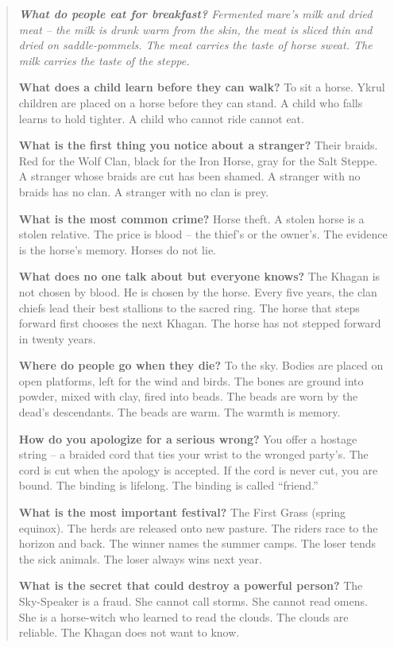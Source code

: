 \documentclass[12pt,oneside]{book}
\newenvironment{almanac}
  {\begin{quote}\small\itshape}
  {\end{quote}}
\begin{document}
\vspace{1em}
\begin{almanac}
\textbf{What do people eat for breakfast?} Fermented mare's milk and dried meat -- the milk is drunk warm from the skin, the meat is sliced thin and dried on saddle-pommels. The meat carries the taste of horse sweat. The milk carries the taste of the steppe.

\textbf{What does a child learn before they can walk?} To sit a horse. Ykrul children are placed on a horse before they can stand. A child who falls learns to hold tighter. A child who cannot ride cannot eat.

\textbf{What is the first thing you notice about a stranger?} Their braids. Red for the Wolf Clan, black for the Iron Horse, gray for the Salt Steppe. A stranger whose braids are cut has been shamed. A stranger with no braids has no clan. A stranger with no clan is prey.

\textbf{What is the most common crime?} Horse theft. A stolen horse is a stolen relative. The price is blood -- the thief's or the owner's. The evidence is the horse's memory. Horses do not lie.

\textbf{What does no one talk about but everyone knows?} The Khagan is not chosen by blood. He is chosen by the horse. Every five years, the clan chiefs lead their best stallions to the sacred ring. The horse that steps forward first chooses the next Khagan. The horse has not stepped forward in twenty years.

\textbf{Where do people go when they die?} To the sky. Bodies are placed on open platforms, left for the wind and birds. The bones are ground into powder, mixed with clay, fired into beads. The beads are worn by the dead's descendants. The beads are warm. The warmth is memory.

\textbf{How do you apologize for a serious wrong?} You offer a hostage string -- a braided cord that ties your wrist to the wronged party's. The cord is cut when the apology is accepted. If the cord is never cut, you are bound. The binding is lifelong. The binding is called ``friend.''

\textbf{What is the most important festival?} The First Grass (spring equinox). The herds are released onto new pasture. The riders race to the horizon and back. The winner names the summer camps. The loser tends the sick animals. The loser always wins next year.

\textbf{What is the secret that could destroy a powerful person?} The Sky-Speaker is a fraud. She cannot call storms. She cannot read omens. She is a horse-witch who learned to read the clouds. The clouds are reliable. The Khagan does not want to know.
\end{almanac}
\end{document}
